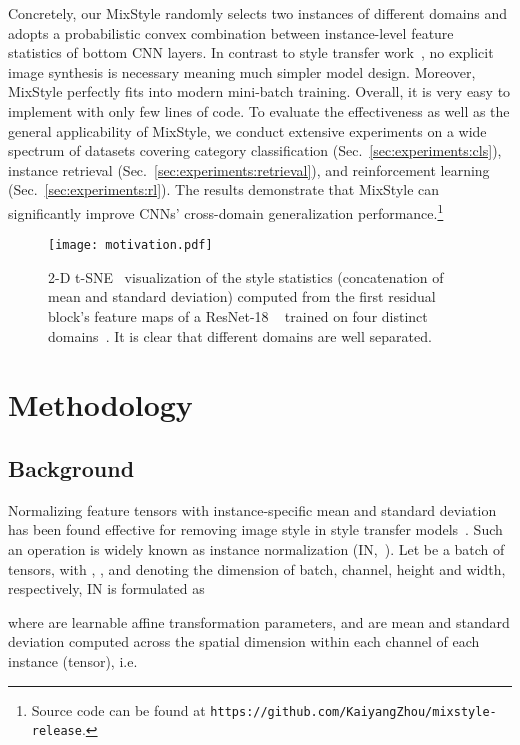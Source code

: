 \documentclass{article} \usepackage{iclr2021_conference,times}
\begin{document}
Concretely, our MixStyle randomly selects two instances of different domains and adopts a probabilistic convex combination between instance-level feature statistics of bottom CNN layers. In contrast to style transfer work~\citep{huang2017arbitrary,dumoulin2017learned}, no explicit image synthesis is necessary meaning much simpler model design. Moreover, MixStyle perfectly fits into modern mini-batch training. Overall, it is very easy to implement with only few lines of code. To evaluate the effectiveness as well as the general applicability of MixStyle, we conduct extensive experiments on a wide spectrum of datasets covering category classification (Sec.~\ref{sec:experiments:cls}), instance retrieval (Sec.~\ref{sec:experiments:retrieval}), and reinforcement learning (Sec.~\ref{sec:experiments:rl}). The results demonstrate that MixStyle can significantly improve CNNs' cross-domain generalization performance.\footnote{Source code can be found at \texttt{https://github.com/KaiyangZhou/mixstyle-release}.}

\begin{figure}[t]
    \centering
    \texttt{[image: motivation.pdf]}
    \caption{2-D t-SNE~\citep{tsne} visualization of the style statistics (concatenation of mean and standard deviation) computed from the first residual block's feature maps of a ResNet-18 ~\citep{he2016deep} trained on four distinct domains~\citep{li2017deeper}. It is clear that different domains are well separated. }
    \label{fig:motivation}
\end{figure}


\section{Methodology} \label{sec:method}

\subsection{Background} \label{sec:method:bg}
Normalizing feature tensors with instance-specific mean and standard deviation has been found effective for removing image style in style transfer models~\citep{ulyanov2016instance,huang2017arbitrary,dumoulin2017learned}. Such an operation is widely known as instance normalization (IN,~\citet{ulyanov2016instance}). Let  be a batch of tensors, with , ,  and  denoting the dimension of batch, channel, height and width, respectively, IN is formulated as

where  are learnable affine transformation parameters, and  are mean and standard deviation computed across the spatial dimension within each channel of each instance (tensor), i.e.
\end{document}
